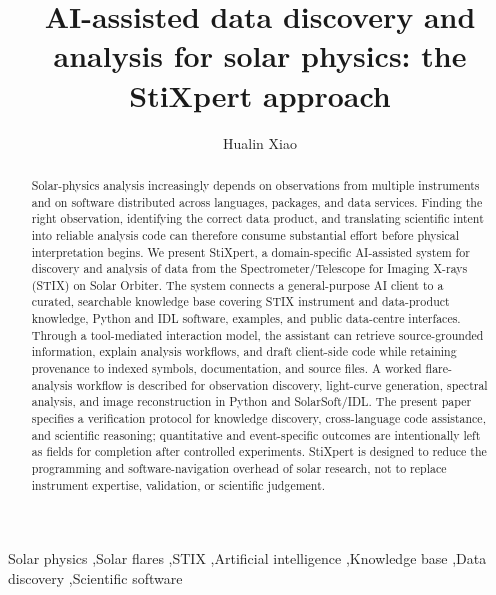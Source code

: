 \documentclass[preprint,review,12pt]{elsarticle}
\begin{document}
\begin{frontmatter}

\title{AI-assisted data discovery and analysis for solar physics: the StiXpert approach}

\author[inst1,inst2]{Hualin Xiao}

\address[inst1]{Physikalisch-Meteorologisches Observatorium Davos/World Radiation Center (PMOD/WRC), Davos, Switzerland}
\address[inst2]{University of Applied Sciences and Arts Northwestern Switzerland (FHNW), Switzerland}

\begin{abstract}
Solar-physics analysis increasingly depends on observations from multiple instruments and on software distributed across languages, packages, and data services. Finding the right observation, identifying the correct data product, and translating scientific intent into reliable analysis code can therefore consume substantial effort before physical interpretation begins. We present StiXpert, a domain-specific AI-assisted system for discovery and analysis of data from the Spectrometer/Telescope for Imaging X-rays (STIX) on Solar Orbiter. The system connects a general-purpose AI client to a curated, searchable knowledge base covering STIX instrument and data-product knowledge, Python and IDL software, examples, and public data-centre interfaces. Through a tool-mediated interaction model, the assistant can retrieve source-grounded information, explain analysis workflows, and draft client-side code while retaining provenance to indexed symbols, documentation, and source files. A worked flare-analysis workflow is described for observation discovery, light-curve generation, spectral analysis, and image reconstruction in Python and SolarSoft/IDL. The present paper specifies a verification protocol for knowledge discovery, cross-language code assistance, and scientific reasoning; quantitative and event-specific outcomes are intentionally left as fields for completion after controlled experiments. StiXpert is designed to reduce the programming and software-navigation overhead of solar research, not to replace instrument expertise, validation, or scientific judgement.
\end{abstract}

\begin{keyword}
Solar physics \sep Solar flares \sep STIX \sep Artificial intelligence \sep Knowledge base \sep Data discovery \sep Scientific software
\end{keyword}

\end{frontmatter}





\end{document}

